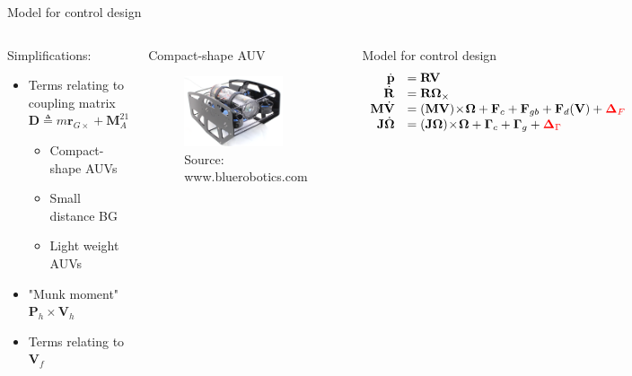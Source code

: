 \documentclass{beamer}
\begin{document}
\begin{frame}{Model for control design}
\begin{columns}
	\begin{block}{Simplifications:}
		\begin{itemize}
			\scriptsize
			\item Terms relating to coupling matrix $\mathbf{D} \triangleq m \mathbf{r}_{G\times} + \mathbf{M}_A^{21}$
			\begin{itemize}
				\scriptsize
				\item Compact-shape AUVs
				\item Small distance BG
				\item Light weight AUVs
			\end{itemize}
			\item "Munk moment" $\mathbf{P}_h \!\times \!\mathbf{V}_h$
			\item Terms relating to $\mathbf{V}_f$
		\end{itemize}		
	\end{block}
	\begin{block}{Compact-shape AUV}
		\begin{figure}
			\includegraphics[width = 0.8\textwidth]{Images/Bluerov_modif.png}\\
			\tiny {\color{blue} Source: www.bluerobotics.com}
		\end{figure}
	\end{block}
	\pause
	\begin{block}{Model for control design}
		\scriptsize \vspace{-0.3cm}
		\[
		\begin{array}{rl}
		\dot{\mathbf{p}} & =  \mathbf{R} \mathbf{V} \label{eq:kinematicsPos}\\
		\dot{\mathbf{R}} & =  \mathbf{R} \mathbf{\Omega}_\times \\
		\mathbf{M}\dot{\mathbf{V}} &= (\mathbf{M}\mathbf{V}) \!\times\!\mathbf{\Omega} + \mathbf{F}_c + \mathbf{F}_{gb} + \mathbf{F}_d(\mathbf{V}) +{\color{red}\mathbf{\Delta}_F}  \\
		\mathbf{J}\dot{\mathbf{\Omega}} &=  (\mathbf{J}\mathbf{\Omega}) \!\times\! \mathbf{\mathbf{\Omega}} + \mathbf{\Gamma}_c + \mathbf{\Gamma}_g +  {\color{red}\mathbf{\Delta}_{\Gamma}}
		\end{array} 
		\]
		

\end{block}
\end{columns}
\end{frame}
\end{document}
